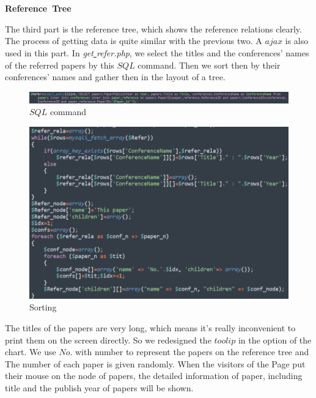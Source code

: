 \documentclass{article}
\begin{document}
	\\
	\\
	\textbf{Reference\ Tree}
	\par The third part is the reference tree, which shows the reference relations clearly. The process of getting data is quite similar with the previous two. A \(ajax\)  is also used in this part. In \emph{get\underline{ }refer.php}, we select the titles and the conferences' names of the referred papers by this \(SQL\) command. Then we sort then by their conferences' names and gather then in the layout of a tree.
	\begin{figure}[H]
		\centering
		\includegraphics[width=0.9\linewidth]{p_17.png}
		\caption{\(SQL\) command}
	\end{figure}
	\begin{figure}[H]
		\centering
		\includegraphics[width=0.6\linewidth]{p_18.png}
		\caption{Sorting}
	\end{figure}
	The titles of the papers are very long, which means it's really inconvenient to print them on the screen directly. So we redesigned the \(toolip\) in the option of the chart. We use \(No.\) with number to represent the papers on the reference tree and The number of each paper is given randomly. When the visitors of the Page put their mouse on the node of papers, the detailed information of paper, including title and the publish year of papers will be shown.
\end{document}
